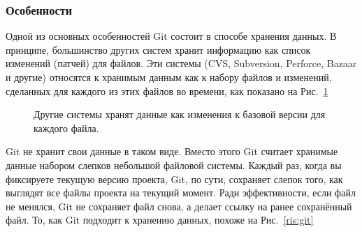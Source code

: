 \documentclass{article}
\begin{document}
			\subsubsection{Особенности}
				Одной из основных особенностей Git состоит в способе хранения данных. В принципе, большинство других систем 					хранит 	информацию как список изменений (патчей) для файлов. Эти системы (CVS, Subversion, Perforce, Bazaar и другие) 			относятся к хранимым данным как к набору файлов и изменений, сделанных для каждого из этих файлов во времени, как 					показано на Рис.~\ref{ris:other-scv}
			
			\begin{figure}[h!]
				\caption{Другие системы хранят данные как изменения к базовой версии для каждого файла.}
				\label{ris:other-scv}
			\end{figure}	
			\newpage
				Git не хранит свои данные в таком виде. Вместо этого Git считает хранимые данные набором слепков небольшой 						файловой системы. Каждый раз, когда вы фиксируете текущую версию проекта, Git, по сути, сохраняет слепок того, как 					выглядят все файлы проекта на текущий момент. Ради эффективности, если файл не менялся, Git не сохраняет файл снова, 				а делает ссылку на ранее сохранённый файл. То, как Git подходит к хранению данных, похоже на Рис.~\ref{ris:git}
			
\end{document}
